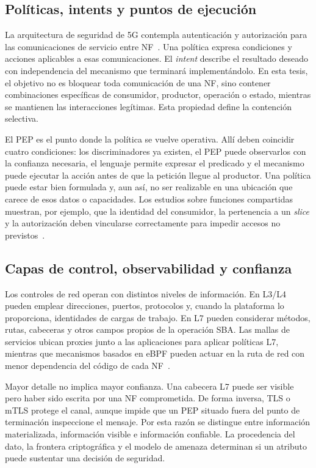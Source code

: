 \subsection{Políticas, intents y puntos de ejecución}
\label{subsec:fundamentos-politicas}

La arquitectura de seguridad de 5G contempla autenticación y autorización para las comunicaciones de servicio entre NF~\cite{ETSI_TS_133501_R16}. Una política expresa condiciones y acciones aplicables a esas comunicaciones. El \textit{intent} describe el resultado deseado con independencia del mecanismo que terminará implementándolo. En esta tesis, el objetivo no es bloquear toda comunicación de una NF, sino contener combinaciones específicas de consumidor, productor, operación o estado, mientras se mantienen las interacciones legítimas. Esta propiedad define la contención selectiva.

El PEP es el punto donde la política se vuelve operativa. Allí deben coincidir cuatro condiciones: los discriminadores ya existen, el PEP puede observarlos con la confianza necesaria, el lenguaje permite expresar el predicado y el mecanismo puede ejecutar la acción antes de que la petición llegue al productor. Una política puede estar bien formulada y, aun así, no ser realizable en una ubicación que carece de esos datos o capacidades. Los estudios sobre funciones compartidas muestran, por ejemplo, que la identidad del consumidor, la pertenencia a un \textit{slice} y la autorización deben vincularse correctamente para impedir accesos no previstos~\cite{E0092}.

\subsection{Capas de control, observabilidad y confianza}
\label{subsec:fundamentos-observabilidad}

Los controles de red operan con distintos niveles de información. En L3/L4 pueden emplear direcciones, puertos, protocolos y, cuando la plataforma lo proporciona, identidades de cargas de trabajo. En L7 pueden considerar métodos, rutas, cabeceras y otros campos propios de la operación SBA. Las mallas de servicios ubican proxies junto a las aplicaciones para aplicar políticas L7, mientras que mecanismos basados en eBPF pueden actuar en la ruta de red con menor dependencia del código de cada NF~\cite{E0005,E0019}.

Mayor detalle no implica mayor confianza. Una cabecera L7 puede ser visible pero haber sido escrita por una NF comprometida. De forma inversa, TLS o mTLS protege el canal, aunque impide que un PEP situado fuera del punto de terminación inspeccione el mensaje. Por esta razón se distingue entre información materializada, información visible e información confiable. La procedencia del dato, la frontera criptográfica y el modelo de amenaza determinan si un atributo puede sustentar una decisión de seguridad.

